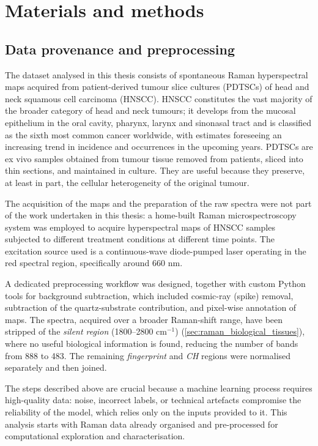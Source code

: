 \chapter{Materials and methods}
\label{ch:materials_methods}

\section{Data provenance and preprocessing}
\label{sec:data_provenance}

The dataset analysed in this thesis consists of spontaneous Raman hyperspectral maps acquired from patient-derived tumour slice cultures (PDTSCs) of head and neck squamous cell carcinoma (HNSCC). 
HNSCC constitutes the vast majority of the
broader category of head and neck tumours; it develops from the mucosal epithelium in
the oral cavity, pharynx, larynx and sinonasal tract and is classified as the sixth most
common cancer worldwide, with estimates foreseeing an increasing trend in incidence and
occurrences in the upcoming years.
 PDTSCs are ex vivo samples obtained from tumour tissue removed from patients, sliced into thin sections, and maintained in culture. They are useful because they preserve, at least in part, the cellular heterogeneity of the original tumour.

The acquisition of the maps and the preparation of the raw spectra were not part of the work undertaken in this thesis: a home-built Raman microspectroscopy system was employed to acquire hyperspectral maps of HNSCC samples subjected to different treatment conditions at different time points.  The excitation source used is a continuous-wave diode-pumped laser operating in the red spectral region, specifically around 660 nm.

A dedicated preprocessing workflow was designed, together with custom Python
tools for background subtraction, which included cosmic-ray (spike) removal, subtraction of the quartz-substrate contribution, and pixel-wise annotation of maps. 
The spectra, acquired over a broader Raman-shift range, have been stripped of the \textit{silent region} (1800--2800 $\mathrm{cm}^{-1}$) (\cref{sec:raman_biological_tissues}), where no useful biological information is found, reducing the number of bands from 888 to 483. The remaining \textit{fingerprint} and \textit{CH} regions were normalised separately and then joined.

The steps described above are crucial because a machine learning process requires high-quality data: noise, incorrect labels, or technical artefacts compromise the reliability of the model, which relies only on the inputs provided to it.
This analysis starts with Raman data already organised and pre-processed for computational exploration and characterisation. 

